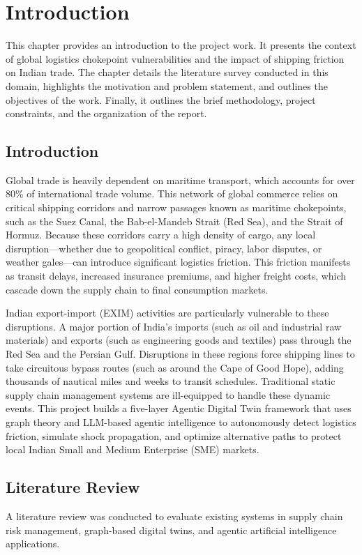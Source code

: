 \chapter{Introduction}
This chapter provides an introduction to the project work. It presents the context of global logistics chokepoint vulnerabilities and the impact of shipping friction on Indian trade. The chapter details the literature survey conducted in this domain, highlights the motivation and problem statement, and outlines the objectives of the work. Finally, it outlines the brief methodology, project constraints, and the organization of the report.

\section[Introduction]{\textbf{Introduction}}
Global trade is heavily dependent on maritime transport, which accounts for over 80\% of international trade volume. This network of global commerce relies on critical shipping corridors and narrow passages known as maritime chokepoints, such as the Suez Canal, the Bab-el-Mandeb Strait (Red Sea), and the Strait of Hormuz. Because these corridors carry a high density of cargo, any local disruption—whether due to geopolitical conflict, piracy, labor disputes, or weather gales—can introduce significant logistics friction. This friction manifests as transit delays, increased insurance premiums, and higher freight costs, which cascade down the supply chain to final consumption markets.

Indian export-import (EXIM) activities are particularly vulnerable to these disruptions. A major portion of India's imports (such as oil and industrial raw materials) and exports (such as engineering goods and textiles) pass through the Red Sea and the Persian Gulf. Disruptions in these regions force shipping lines to take circuitous bypass routes (such as around the Cape of Good Hope), adding thousands of nautical miles and weeks to transit schedules. Traditional static supply chain management systems are ill-equipped to handle these dynamic events. This project builds a five-layer Agentic Digital Twin framework that uses graph theory and LLM-based agentic intelligence to autonomously detect logistics friction, simulate shock propagation, and optimize alternative paths to protect local Indian Small and Medium Enterprise (SME) markets.

\section[Literature Review]{\textbf{Literature Review}}
A literature review was conducted to evaluate existing systems in supply chain risk management, graph-based digital twins, and agentic artificial intelligence applications.


